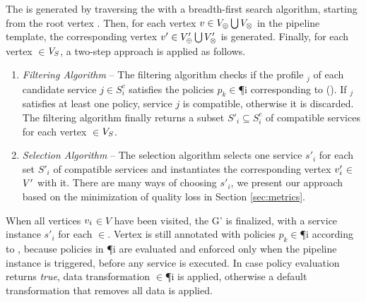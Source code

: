 The \pipelineInstance  is generated by traversing the \pipelineTemplate with a breadth-first search algorithm, starting from the root vertex .
Then, for each vertex $v\in V_{\oplus}\bigcup V_{\otimes}$ in the pipeline template, the corresponding vertex $v'\in V'_{\oplus}\bigcup V'_{\otimes}$ is generated.
Finally, for each vertex $\in$$V_S$, a two-step approach is applied as follows.

\begin{enumerate}

    \item \textit{Filtering Algorithm} -- The filtering algorithm checks if the profile \profile$_j$ of each candidate service $\si{j}$$\in$$S^c_{i}$ satisfies the policies $p_k$$\in$\P{i} corresponding to \myLambda(). If \profile$_j$ satisfies at least one policy,  service $\si{j}$ is compatible, otherwise it is discarded. The filtering algorithm finally returns a subset $S'_{i}$$\subseteq$$S^c_{i}$ of compatible services for each vertex $\in$$V_S$.
    \item \textit{Selection Algorithm} -- The selection algorithm selects one service $s'_i$ for each set $S'_{i}$ of compatible services and instantiates the corresponding vertex $v'_{i}$$\in$$V'$ with it. There are many ways of choosing $s'_i$, we present our approach based on the minimization of quality loss in Section \ref{sec:metrics}.
  \end{enumerate}

  When all vertices $v_{i}$$\in$$V$ have been visited, the \pipelineInstance G' is finalized, with a service instance $s'_i$ for each $\in$\Vp. Vertex  is still annotated with policies $p_k$$\in$\P{i} according to \myLambda, because policies in \P{i} are evaluated and enforced only when the pipeline instance is triggered, before any service is executed. In case policy evaluation returns \emph{true}, data transformation \TP$\in$\P{i} is applied, otherwise a default transformation that removes all data is applied.

